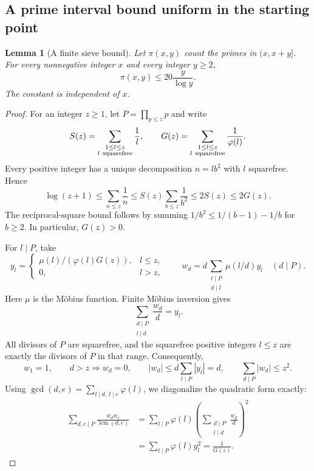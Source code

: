 \documentclass[12pt,leqno]{article}
\numberwithin{equation}{section}
\newtheorem{lemma}[theorem]{Lemma}
\theoremstyle{remark}
\begin{document}
\subsection{A prime interval bound uniform in the starting point}
\begin{lemma}[A finite sieve bound]\label{lem:primeinterval}
Let $\pi(x,y)$ count the primes in $(x,x+y]$. For every nonnegative integer $x$ and every integer $y\ge2$,
\begin{equation}\label{eq:primeinterval}
\pi(x,y)\le20\frac y{\log y}.
\end{equation}
The constant is independent of $x$.
\end{lemma}
\begin{proof}
For an integer $z\ge1$, let $P=\prod_{p\le z}p$ and write
\[
S(z)=\sum_{\substack{1\le l\le z\\l\ {\rm squarefree}}}\frac1l,
\qquad G(z)=\sum_{\substack{1\le l\le z\\l\ {\rm squarefree}}}\frac1{\varphi(l)}.
\]
Every positive integer has a unique decomposition $n=lb^2$ with $l$ squarefree. Hence
\[
\log(z+1)\le\sum_{n\le z}\frac1n
\le S(z)\sum_{b\le z}\frac1{b^2}\le2S(z)\le2G(z).
\]
The reciprocal-square bound follows by summing $1/b^2\le1/(b-1)-1/b$ for $b\ge2$. In particular, $G(z)>0$.

For $l\mid P$, take
\[
y_l=\begin{cases}\mu(l)/(\varphi(l)G(z)),&l\le z,\\0,&l>z,\end{cases}
\qquad
w_d=d\sum_{\substack{l\mid P\\d\mid l}}\mu(l/d)y_l\quad(d\mid P).
\]
Here $\mu$ is the M\"obius function. Finite M\"obius inversion gives
\[
\sum_{\substack{d\mid P\\l\mid d}}\frac{w_d}{d}=y_l.
\]
All divisors of $P$ are squarefree, and the squarefree positive integers $l\le z$ are exactly the divisors of $P$ in that range. Consequently,
\[
w_1=1,\qquad d>z\Longrightarrow w_d=0,\qquad
|w_d|\le d\sum_{l\mid P}|y_l|=d,
\qquad \sum_{d\mid P}|w_d|\le z^2.
\]
Using $\gcd(d,e)=\sum_{l\mid d,\ l\mid e}\varphi(l)$, we diagonalize the quadratic form exactly:
\begin{align*}
\sum_{d,e\mid P}\frac{w_dw_e}{\operatorname{lcm}(d,e)}
&=\sum_{l\mid P}\varphi(l)
\left(\sum_{\substack{d\mid P\\l\mid d}}\frac{w_d}{d}\right)^2\\
&=\sum_{l\mid P}\varphi(l)y_l^2=\frac1{G(z)}.
\end{align*}


\end{proof}
\end{document}
